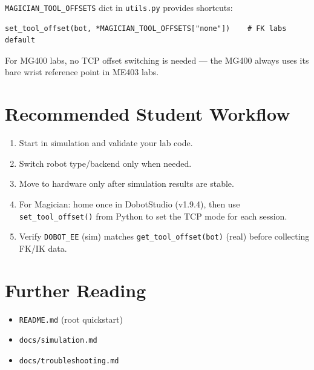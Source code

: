 \documentclass[11pt,a4paper]{article}
\begin{document}
\texttt{MAGICIAN\_TOOL\_OFFSETS} dict in \texttt{utils.py} provides shortcuts:
\begin{verbatim}
set_tool_offset(bot, *MAGICIAN_TOOL_OFFSETS["none"])    # FK labs default
\end{verbatim}

For MG400 labs, no TCP offset switching is needed --- the MG400 always uses
its bare wrist reference point in ME403 labs.

\section{Recommended Student Workflow}
\begin{enumerate}
  \item Start in simulation and validate your lab code.
  \item Switch robot type/backend only when needed.
  \item Move to hardware only after simulation results are stable.
  \item For Magician: home once in DobotStudio (v1.9.4), then use
        \texttt{set\_tool\_offset()} from Python to set the TCP mode for each session.
  \item Verify \texttt{DOBOT\_EE} (sim) matches \texttt{get\_tool\_offset(bot)} (real)
        before collecting FK/IK data.
\end{enumerate}

\section{Further Reading}
\begin{itemize}
  \item \texttt{README.md} (root quickstart)
  \item \texttt{docs/simulation.md}
  \item \texttt{docs/troubleshooting.md}
\end{itemize}
\end{document}

